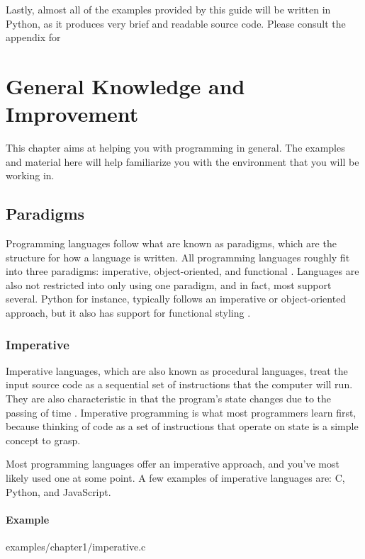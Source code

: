 \documentclass[12pt, oneside, a4paper]{book}
\begin{document}
      Lastly, almost all of the examples provided by this guide will be written in Python, as it produces very brief and readable source code.
      Please consult the appendix for 
   \newpage

   \chapter{General Knowledge and Improvement}
   \label{chap:general}
      This chapter aims at helping you with programming in general.
      The examples and material here will help familiarize you with the environment that you will be working in.

      \section{Paradigms}
         Programming languages follow what are known as paradigms, which are the structure for how a language is written.
         All programming languages roughly fit into three paradigms: imperative, object-oriented, and functional \autocite{normarkOverviewFourMain}.
         Languages are also not restricted into only using one paradigm, and in fact, most support several.
         Python for instance, typically follows an imperative or object-oriented approach, but it also has support for functional styling \autocite{GeneralPythonFAQ}.

         \subsection{Imperative}
         Imperative languages, which are also known as procedural languages, treat the input source code as a sequential set of instructions that the computer will run.
         They are also characteristic in that the program's state changes due to the passing of time \autocite{normarkOverviewFourMain}.
         Imperative programming is what most programmers learn first, because thinking of code as a set of instructions that operate on state is a simple concept to grasp.

         Most programming languages offer an imperative approach, and you've most likely used one at some point.
         A few examples of imperative languages are: C, Python, and JavaScript.

         \subsubsection{Example}
         
         {examples/chapter1/imperative.c}
\end{document}
